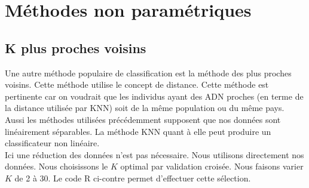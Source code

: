 \documentclass[12pt,a4paper]{article}
\begin{document}
\section{Méthodes non paramétriques}
\subsection{K plus proches voisins}
Une autre méthode populaire de classification est la méthode des plus proches
voisins. Cette méthode utilise le concept de distance. Cette méthode est
pertinente car on voudrait que les individus ayant des ADN proches (en terme
de la distance utilisée par KNN) soit de la même population ou du même pays. \\
Aussi les méthodes utilisées précédemment supposent que nos données
sont linéairement séparables. La méthode KNN quant à elle peut produire un
classificateur non linéaire.\vspace{3mm}\\
Ici une réduction des données n'est pas nécessaire. Nous utilisons directement
nos données. Nous choisissons le $K$ optimal par validation croisée. Nous
faisons varier $K$ de 2 à 30. Le code R ci-contre permet d'effectuer cette
sélection.\vspace{2mm}
\end{document}
